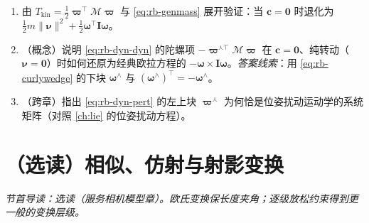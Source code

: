 \begin{practice}
\begin{enumerate}
  \item 由 $T_{\text{kin}}=\tfrac12\boldsymbol{\varpi}^\top\boldsymbol{\mathcal{M}}\boldsymbol{\varpi}$ 与 \cref{eq:rb-genmass} 展开验证：当 $\mathbf{c}=\mathbf{0}$ 时退化为 $\tfrac12 m\|\boldsymbol{\nu}\|^2+\tfrac12\boldsymbol{\omega}^\top\mathbf{I}\boldsymbol{\omega}$。
  \item （概念）说明 \cref{eq:rb-dyn-dyn} 的陀螺项 $-\boldsymbol{\varpi}^{\curlywedge\top}\boldsymbol{\mathcal{M}}\boldsymbol{\varpi}$ 在 $\mathbf{c}=\mathbf{0}$、纯转动（$\boldsymbol{\nu}=\mathbf{0}$）时如何还原为经典欧拉方程的 $-\boldsymbol{\omega}\times\mathbf{I}\boldsymbol{\omega}$。\emph{答案线索}：用 \cref{eq:rb-curlywedge} 的下块 $\boldsymbol{\omega}^\wedge$ 与 $(\boldsymbol{\omega}^\wedge)^\top=-\boldsymbol{\omega}^\wedge$。
  \item （跨章）指出 \cref{eq:rb-dyn-pert} 的左上块 $\boldsymbol{\varpi}^\curlywedge$ 为何恰是位姿扰动运动学的系统矩阵（对照 \cref{ch:lie} 的位姿扰动方程）。
\end{enumerate}
\end{practice}

\section{（选读）相似、仿射与射影变换}
\label{sec:rb-projective}
\noindent\emph{节首导读：选读（服务相机模型章）。欧氏变换保长度夹角；逐级放松约束得到更一般的变换层级。}

